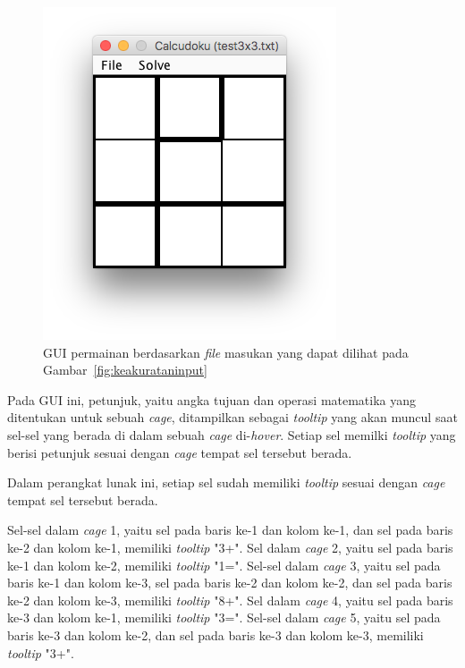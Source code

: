 \begin{enumerate}
\begin{figure}
\centering
\captionsetup{justification=centering}
\includegraphics[scale=0.5]{Gambar/ImplementasiPengujian/Output1.png}
\caption[GUI permainan berdasarkan \textit{file} masukan yang dapat dilihat pada Gambar~\ref{fig:keakurataninput}]{GUI permainan berdasarkan \textit{file} masukan yang dapat dilihat pada Gambar~\ref{fig:keakurataninput}}
\label{fig:keakuratanoutput}
\end{figure}

Pada GUI ini, petunjuk, yaitu angka tujuan dan operasi matematika yang ditentukan untuk sebuah \textit{cage}, ditampilkan sebagai \textit{tooltip} yang akan muncul saat sel-sel yang berada di dalam sebuah \textit{cage} di-\textit{hover}. Setiap sel memilki \textit{tooltip} yang berisi petunjuk sesuai dengan \textit{cage} tempat sel tersebut berada. 

Dalam perangkat lunak ini, setiap sel sudah memiliki \textit{tooltip} sesuai dengan \textit{cage} tempat sel tersebut berada. 

Sel-sel dalam \textit{cage} 1, yaitu sel pada baris ke-1 dan kolom ke-1, dan sel pada baris ke-2 dan kolom ke-1, memiliki \textit{tooltip} "3+". Sel dalam \textit{cage} 2, yaitu sel pada baris ke-1 dan kolom ke-2, memiliki \textit{tooltip} "1=". Sel-sel dalam \textit{cage} 3, yaitu sel pada baris ke-1 dan kolom ke-3, sel pada baris ke-2 dan kolom ke-2, dan sel pada baris ke-2 dan kolom ke-3, memiliki \textit{tooltip} "8+". Sel dalam \textit{cage} 4, yaitu sel pada baris ke-3 dan kolom ke-1, memiliki \textit{tooltip} "3=". Sel-sel dalam \textit{cage} 5, yaitu sel pada baris ke-3 dan kolom ke-2, dan sel pada baris ke-3 dan kolom ke-3, memiliki \textit{tooltip} "3+".


\end{enumerate}
